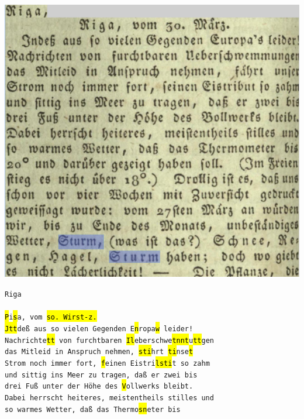 \documentclass[a4paper,twoside,12pt]{article}
\begin{document}
\begin{table}[h]
\begin{minipage}[b]{0.415\textwidth}
    \centering
    \includegraphics[width=\linewidth]{images/ocr_comparaison.png}
  \end{minipage}
  \hspace{0.05\textwidth}
  \begin{varwidth}[b]{0.5\textwidth}
    \centering
    \scriptsize
      \parbox[b]{\linewidth}{\texttt{Riga\\\\\hl{P}i\hl{s}a, vom \hl{so. Wirst-z. \fg{}} \\ \hl{\fg{} Jtt}deß aus so vielen Gegenden E\hl{n}ropa\hl{w} leider!\\
Nachrichte\hl{tt} von furchtbaren \hl{Il}eberschwe\hl{tnnt}u\hl{tt}gen\\
das Mitleid in Anspruch nehmen, \hl{\fg{}sti}hrt \hl{ti}nse\hl{t}\\
Strom noch immer fort, \hl{f}einen Eistri\hl{lsti}t so zahm\\
und\hl{\fg{}} sittig ins Meer zu tragen, daß er zwei bis\\
drei\hl{\fg{}} Fuß \hl{\fg{}}unter der Höhe des \hl{V}ollwerks bleibt.\\
Dabei herrscht heiteres, meistentheils stilles und\\
so warmes Wetter, daß das Thermo\hl{sn}eter bis\\
}}
\end{varwidth}
\end{table}
\end{document}

